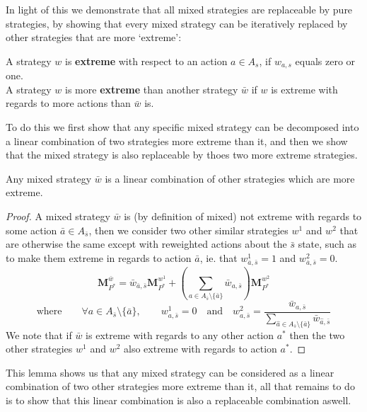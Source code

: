 In light of this we demonstrate that all mixed strategies are replaceable by pure strategies, by showing that every mixed strategy can be iteratively replaced by other strategies that are more `extreme':

\begin{Definition}\label{def2}
A strategy $w$ is \textbf{extreme} with respect to an action $a\in A_{s}$, if $w_{a,s}$ equals zero or one.\\A strategy $w$ is more \textbf{extreme} than another strategy $\bar{w}$ if $w$ is extreme with regards to more actions than $\bar{w}$ is.
\end{Definition}

To do this we first show that any specific mixed strategy can be decomposed into a linear combination of two strategies more extreme than it, and then we show that the mixed strategy is also replaceable by thoes two more extreme strategies.

\begin{Lemma}\label{lemma:part1}
Any mixed strategy $\bar{w}$ is a linear combination of other strategies which are more extreme.
\end{Lemma}
\begin{proof}
A mixed strategy $\bar{w}$ is (by definition of mixed) not extreme with regards to some action $\bar{a}\in A_{\bar{s}}$, then we consider two other similar strategies $w^1$ and $w^2$ that are otherwise the same except with reweighted actions about the $\bar{s}$ state, such as to make them extreme in regards to action $\bar{a}$, ie. that $w^1_{\bar{a},\bar{s}}=1$ and $w^2_{\bar{a},\bar{s}}=0$.
$$ \mathbf{M}_{P^*}^{\bar{w}} = \bar{w}_{\bar{a},\bar{s}}\mathbf{M}_{P^*}^{w^1} + \left(\sum_{a\in A_{\bar{s}}\setminus \{\bar{a}\}} \bar{w}_{a,\bar{s}}\right)\mathbf{M}_{P^*}^{w^2} $$
$$\text{where}\qquad \forall a\in A_{\bar{s}}\setminus \{\bar{a}\},\qquad  w^1_{a,\bar{s}}=0 \quad\text{and}\quad w^2_{a,\bar{s}} = \frac{\bar{w}_{a,\bar{s}}}{\sum_{\hat{a}\in A_{\bar{s}}\setminus \{\bar{a}\}} \bar{w}_{\hat{a},\bar{s}}} $$
We note that if $\bar{w}$ is extreme with regards to any other action $a^*$ then the two other strategies $w^1$ and $w^2$ also extreme with regards to action $a^*$.
\end{proof}

This lemma shows us that any mixed strategy can be considered as a linear combination of two other strategies more extreme than it, all that remains to do is to show that this linear combination is also a replaceable combination aswell.


